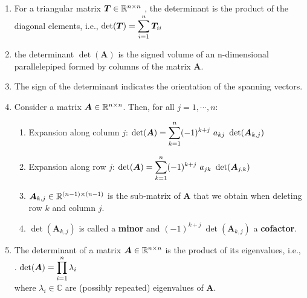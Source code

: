 \begin{enumerate}
    \item For a triangular matrix $\bm{T} \in \mathbb{R}^{n\times n}$ , the determinant is the product of the diagonal elements, i.e., $\det(\bm{T}) = \displaystyle\sum ^n _{i=1} \bm{T}_{ii}$
    \hfill \cite{mfml/book/mml/Deisenroth-Faisal-Ong}

    \item the determinant $\det(\bm{A})$ is the signed volume of an n-dimensional parallelepiped formed by columns of the matrix $\bm{A}$.
    \hfill \cite{mfml/book/mml/Deisenroth-Faisal-Ong}

    \item The sign of the determinant indicates the orientation of the spanning vectors.
    \hfill \cite{mfml/book/mml/Deisenroth-Faisal-Ong}

    \item 
    \begin{theorem}
    Consider a matrix $\bm{A} \in \mathbb{R}^{n\times n}$. Then, for all $j = 1, \cdots , n$:
    \hfill \cite{mfml/book/mml/Deisenroth-Faisal-Ong}
    \end{theorem}
    \begin{enumerate}
        \item Expansion along column $j$: 
        $
            \det(\bm{A}) = \displaystyle\sum^n _{k=1} (-1)^{k+j}\  a_{kj}\ \det(\bm{A}_{k,j} )
        $
        \hfill \cite{mfml/book/mml/Deisenroth-Faisal-Ong}

        \item Expansion along row $j$:
        $
            \det(\bm{A}) = \displaystyle\sum^n _{k=1} (-1)^{k+j}\  a_{jk}\ \det(\bm{A}_{j,k} )
        $
        \hfill \cite{mfml/book/mml/Deisenroth-Faisal-Ong}

        \item $\bm{A}_{k,j} \in \mathbb{R}^{(n-1)\times(n-1)}$ is the sub-matrix of $\bm{A}$ that we obtain when deleting row $k$ and column $j$.
        \hfill \cite{mfml/book/mml/Deisenroth-Faisal-Ong}

        \item $\det(\bm{A}_{k,j} )$ is called a \textbf{minor} and $(-1)^{k+j}\ \det(\bm{A}_{k,j} )$ a \textbf{cofactor}.
        \hfill \cite{mfml/book/mml/Deisenroth-Faisal-Ong}
    \end{enumerate}

    \item \begin{theorem}
        The determinant of a matrix $\bm{A} \in \mathbb{R}^{n\times n}$ is the product of its eigenvalues, i.e.,
        \hfill \cite{mfml/book/mml/Deisenroth-Faisal-Ong}
        \\
        .\hfill
        $
            \det(\bm{A}) = \displaystyle\prod_{i=1}^{n} \lambda_i
        $
        \hfill \cite{mfml/book/mml/Deisenroth-Faisal-Ong}
        \\
        where $\lambda_i \in \mathbb{C}$ are (possibly repeated) eigenvalues of $\bm{A}$.
        \hfill \cite{mfml/book/mml/Deisenroth-Faisal-Ong}
    \end{theorem}

\end{enumerate}



